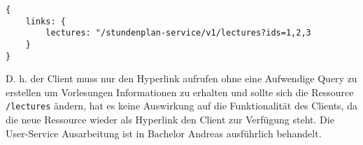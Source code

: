 \begin{verbatim}
{
    links: {
        lectures: "/stundenplan-service/v1/lectures?ids=1,2,3
    }
}
\end{verbatim}

D. h. der Client muss nur den Hyperlink aufrufen ohne eine Aufwendige Query zu erstellen um Vorlesungen Informationen zu erhalten und sollte sich die Ressource \verb|/lectures| ändern, hat es keine Auswirkung auf die Funktionalität des Clients, da die neue Ressource wieder als Hyperlink den Client zur Verfügung steht.  Die User-Service Ausarbeitung ist in Bachelor Andreas ausführlich behandelt.
